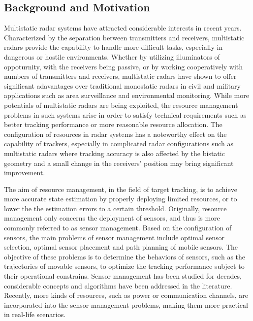 \documentclass[12pt,journal,draftclsnofoot,onecolumn]{IEEEtran}
\begin{document}
\subsection{Background and Motivation}
Multistatic radar systems have attracted considerable interests in recent years. Characterized by the separation between transmitters and receivers, multistatic radars provide the capability to handle more difficult tasks, especially in dangerous or hostile environments. Whether by utilizing illuminators of oppoturnity, with the receivers being passive, or by working cooperatively with numbers of transmitters and receivers, multistatic radars have shown to offer significant adavantages over traditional monostatic radars in civil and military applications such as area surveillance and environmental monitoring\cite{handel1986survey}. While more potentials of multistatic radars are being exploited, the resource management problems in such systems arise in order to satisfy technical requirements such as better tracking performance or more reasonable resource allocation. The configuration of resources in radar systems has a noteworthy effect on the capability of trackers, especially in complicated radar configurations such as multistatic radars where tracking accuracy is also affected by the bistatic geometry and a small change in the receivers' position may bring significant improvement.

 The aim of resource management, in the field of target tracking, is to achieve more accurate state estimation by properly deploying limited resources, or to lower the the estimation errors to a certain threshold\cite{hero2011sensor}. Originally, resource management only concerns the deployment of sensors, and thus is more commonly referred to as sensor management. Based on the configuration of sensors, the main problems of sensor management include optimal sensor selection\cite{tharmarasa2011decentralized,zhan2010adaptive,tharmarasa2009optimization}, optimal sensor placement\cite{xu2017optimal,nguyen2016optimal} and path planning of mobile sensors\cite{tharmarasa2009joint,he2019trajectory,huang2007static,scott2018illuminator}. The objective of these problems is to determine the behaviors of sensors, such as the trajectories of movable sensors, to optimize the tracking performance subject to their operational constrains. Sensor management has been studied for decades, considerable concepts and algorithms have been addressed in the literature\cite{tharmarasa2007pcrlb,tharmarasa2011decentralized,hernandez2004multisensor,dogancay2007online,douganccay2010single}. Recently, more kinds of resources, such as power or communication channels, are incorporated into the sensor management problems, making them more practical in real-life scenarios.
\end{document}
